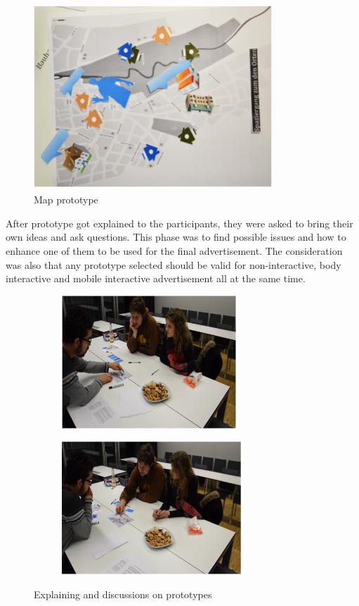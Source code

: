 \begin{itemize}
\begin{figure}[H]
    \centering
    \includegraphics[width=0.8\textwidth,height=7cm]{Figures/4/map}
    \caption{Map prototype}
    \label{fig:mapprot}
\end{figure}


\end{itemize}


After prototype got explained to the participants, they were asked to bring their own ideas and ask questions. This phase was to find possible issues and how to enhance one of them to be used for the final advertisement. The consideration was also that any prototype selected should be valid for non-interactive, body interactive and mobile interactive advertisement all at the same time.

\begin{figure}[H]
    \centering
    \begin{subfigure}[H]{0.45\textwidth}
        \centering
        \includegraphics[width=\textwidth,height=5cm]{Figures/4/show_map}
        \caption{}
        \label{fig:showmap}
    \end{subfigure}
    \begin{subfigure}[H]{0.45\textwidth}
        \centering
        \includegraphics[width=\textwidth,height=5cm]{Figures/4/tell_map}
        \caption{}
        \label{fig:tell_map}
    \end{subfigure}
    \caption{Explaining and discussions on prototypes }
    \label{fig:explaining_and_discussion}
\end{figure}

